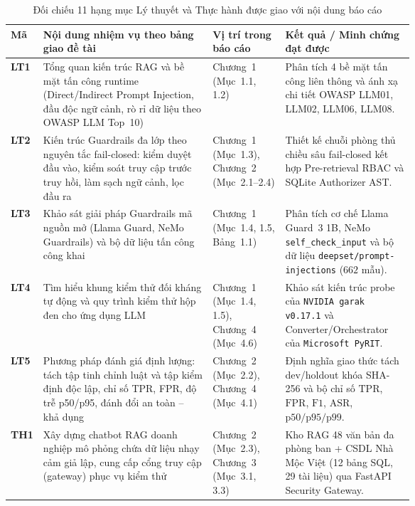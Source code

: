 \begin{table}[!htbp]
\centering
\caption{Đối chiếu 11 hạng mục Lý thuyết và Thực hành được giao với nội dung báo cáo}
\label{tab:doi-chieu-nhiem-vu}
\footnotesize
\setlength{\tabcolsep}{3.5pt}
\begin{tabularx}{\linewidth}{@{}C{0.06\linewidth}L{0.42\linewidth}L{0.18\linewidth}X@{}}
\toprule
\textbf{Mã} & \textbf{Nội dung nhiệm vụ theo bảng giao đề tài} & \textbf{Vị trí trong báo cáo} & \textbf{Kết quả / Minh chứng đạt được} \\
\midrule
\textbf{LT1} & Tổng quan kiến trúc RAG và bề mặt tấn công runtime (Direct/Indirect Prompt Injection, đầu độc ngữ cảnh, rò rỉ dữ liệu theo OWASP LLM Top~10) & Chương~1 (Mục~1.1, 1.2) & Phân tích 4 bề mặt tấn công liên thông và ánh xạ chi tiết OWASP LLM01, LLM02, LLM06, LLM08. \\
\textbf{LT2} & Kiến trúc Guardrails đa lớp theo nguyên tắc fail-closed: kiểm duyệt đầu vào, kiểm soát truy cập trước truy hồi, làm sạch ngữ cảnh, lọc đầu ra & Chương~1 (Mục~1.3), Chương~2 (Mục~2.1--2.4) & Thiết kế chuỗi phòng thủ chiều sâu fail-closed kết hợp Pre-retrieval RBAC và SQLite Authorizer AST. \\
\textbf{LT3} & Khảo sát giải pháp Guardrails mã nguồn mở (Llama Guard, NeMo Guardrails) và bộ dữ liệu tấn công công khai & Chương~1 (Mục~1.4, 1.5, Bảng~1.1) & Phân tích cơ chế Llama Guard~3 1B, NeMo \texttt{self\_\allowbreak check\_\allowbreak input} và bộ dữ liệu \texttt{deepset/\allowbreak prompt-injections} ($662$ mẫu). \\
\textbf{LT4} & Tìm hiểu khung kiểm thử đối kháng tự động và quy trình kiểm thử hộp đen cho ứng dụng LLM & Chương~1 (Mục~1.4, 1.5), Chương~4 (Mục~4.6) & Khảo sát kiến trúc probe của \texttt{NVIDIA garak v0.17.1} và Converter/\allowbreak Orchestrator của \texttt{Microsoft PyRIT}. \\
\textbf{LT5} & Phương pháp đánh giá định lượng: tách tập tinh chỉnh luật và tập kiểm định độc lập, chỉ số TPR, FPR, độ trễ p50/p95, đánh đổi an toàn -- khả dụng & Chương~2 (Mục~2.2), Chương~4 (Mục~4.1) & Định nghĩa giao thức tách dev/holdout khóa SHA-256 và bộ chỉ số $\text{TPR}$, $\text{FPR}$, $\text{F1}$, $\text{ASR}$, $\text{p50/p95/p99}$. \\
\midrule
\textbf{TH1} & Xây dựng chatbot RAG doanh nghiệp mô phỏng chứa dữ liệu nhạy cảm giả lập, cung cấp cổng truy cập (gateway) phục vụ kiểm thử & Chương~2 (Mục~2.3), Chương~3 (Mục~3.1, 3.3) & Kho RAG 48 văn bản đa phòng ban + CSDL Nhà Mộc Việt (12 bảng SQL, 29 tài liệu) qua FastAPI Security Gateway. \\

\end{tabularx}
\end{table}

